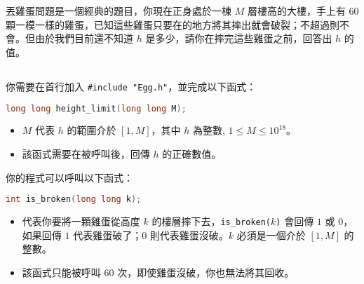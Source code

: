 



\section*{}

\subsection*{}

丟雞蛋問題是一個經典的題目，你現在正身處於一棟 $M$ 層樓高的大樓，手上有 $60$ 顆一模一樣的雞蛋，已知這些雞蛋只要在\bd{\color{red}{超過 $h$ 樓}}的地方將其摔出就會破裂；不超過則不會。但由於我們目前還不知道 $h$ 是多少，請你在摔完這些雞蛋之前，回答出 $h$ 的值。

\subsection*{}

\subsubsection*{}

你需要在首行加入 \texttt{\#include "Egg.h"}，並完成以下函式：

\begin{lstlisting}[language = C++]
long long height_limit(long long M);
\end{lstlisting}

\begin{itemize}
    \item $M$ 代表 $h$ 的範圍介於 $[1,M]$，其中 $h$ 為整數, $1\le M\le 10^{18}$。
    \item 該函式需要在被呼叫後，回傳 $h$ 的正確數值。
\end{itemize}

你的程式可以呼叫以下函式：

\begin{lstlisting}[language = C++]
int is_broken(long long k);
\end{lstlisting}

\begin{itemize}
    \item 代表你要將一顆雞蛋從高度 $k$ 的樓層摔下去，\texttt{is\_broken($k$)} 會回傳 $1$ 或 $0$，如果回傳 $1$ 代表雞蛋破了；$0$ 則代表雞蛋沒破。$k$ 必須是一個介於 $[1,M]$ 的整數。
    \item 該函式只能被呼叫 $60$ 次，即使雞蛋沒破，你也無法將其回收。
\end{itemize}

